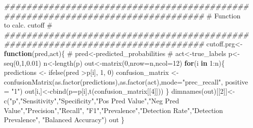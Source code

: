 \documentclass[
  letterpaper,
  DIV=11,
  numbers=noendperiod]{scrartcl}
\newenvironment{Shaded}{\begin{snugshade}}{\end{snugshade}}
\newcommand{\AttributeTok}[1]{\textcolor[rgb]{0.40,0.45,0.13}{#1}}
\newcommand{\CommentTok}[1]{\textcolor[rgb]{0.37,0.37,0.37}{#1}}
\newcommand{\ControlFlowTok}[1]{\textcolor[rgb]{0.00,0.23,0.31}{\textbf{#1}}}
\newcommand{\DecValTok}[1]{\textcolor[rgb]{0.68,0.00,0.00}{#1}}
\newcommand{\DocumentationTok}[1]{\textcolor[rgb]{0.37,0.37,0.37}{\textit{#1}}}
\newcommand{\FloatTok}[1]{\textcolor[rgb]{0.68,0.00,0.00}{#1}}
\newcommand{\FunctionTok}[1]{\textcolor[rgb]{0.28,0.35,0.67}{#1}}
\newcommand{\NormalTok}[1]{\textcolor[rgb]{0.00,0.23,0.31}{#1}}
\newcommand{\OtherTok}[1]{\textcolor[rgb]{0.00,0.23,0.31}{#1}}
\newcommand{\SpecialCharTok}[1]{\textcolor[rgb]{0.37,0.37,0.37}{#1}}
\newcommand{\StringTok}[1]{\textcolor[rgb]{0.13,0.47,0.30}{#1}}
\begin{document}
\begin{Shaded}
\begin{Highlighting}[]
\DocumentationTok{\#\#\#\#\#\#\#\#\#\#\#\#\#\#\#\#\#\#\#\#\#\#\#\#\#\#\#\#\#\#\#\#\#\#\#\#\#\#\#\#\#\#\#\#\#\#\#\#\#\#\#\#\#\#\#\#\#\#\#\#\#\#\#\#\#\#\#\#\#\#\#\#\#\#\#\#\#\#\#\#}
\CommentTok{\#                         Function to calc. cutoff                             \# }
\DocumentationTok{\#\#\#\#\#\#\#\#\#\#\#\#\#\#\#\#\#\#\#\#\#\#\#\#\#\#\#\#\#\#\#\#\#\#\#\#\#\#\#\#\#\#\#\#\#\#\#\#\#\#\#\#\#\#\#\#\#\#\#\#\#\#\#\#\#\#\#\#\#\#\#\#\#\#\#\#\#\#\#\#}
\NormalTok{cutoff.prg}\OtherTok{\textless{}{-}}\ControlFlowTok{function}\NormalTok{(pred,act)\{}
\CommentTok{\# pred\textless{}{-}predicted\_probabilities}
\CommentTok{\# act\textless{}{-}true\_labels}
\NormalTok{p}\OtherTok{\textless{}{-}}\FunctionTok{seq}\NormalTok{(}\DecValTok{0}\NormalTok{,}\DecValTok{1}\NormalTok{,}\FloatTok{0.01}\NormalTok{)}
\NormalTok{n}\OtherTok{\textless{}{-}}\FunctionTok{length}\NormalTok{(p)}
\NormalTok{out}\OtherTok{\textless{}{-}}\FunctionTok{matrix}\NormalTok{(}\DecValTok{0}\NormalTok{,}\AttributeTok{nrow=}\NormalTok{n,}\AttributeTok{ncol=}\DecValTok{12}\NormalTok{)}
\ControlFlowTok{for}\NormalTok{(i }\ControlFlowTok{in} \DecValTok{1}\SpecialCharTok{:}\NormalTok{n)\{}
\NormalTok{predictions }\OtherTok{\textless{}{-}} \FunctionTok{ifelse}\NormalTok{(pred }\SpecialCharTok{\textgreater{}}\NormalTok{p[i], }\DecValTok{1}\NormalTok{, }\DecValTok{0}\NormalTok{)}
\NormalTok{confusion\_matrix }\OtherTok{\textless{}{-}} \FunctionTok{confusionMatrix}\NormalTok{(}\FunctionTok{as.factor}\NormalTok{(predictions),}\FunctionTok{as.factor}\NormalTok{(act),}\AttributeTok{mode=}\StringTok{"prec\_recall"}\NormalTok{, }\AttributeTok{positive =} \StringTok{"1"}\NormalTok{)}
\NormalTok{out[i,]}\OtherTok{\textless{}{-}}\FunctionTok{cbind}\NormalTok{(}\AttributeTok{p=}\NormalTok{p[i],}\FunctionTok{t}\NormalTok{(confusion\_matrix[[}\DecValTok{4}\NormalTok{]]))}
\NormalTok{\}}
\FunctionTok{dimnames}\NormalTok{(out)[[}\DecValTok{2}\NormalTok{]]}\OtherTok{\textless{}{-}}\FunctionTok{c}\NormalTok{(}\StringTok{"p"}\NormalTok{,}\StringTok{"Sensitivity"}\NormalTok{,}\StringTok{"Specificity"}\NormalTok{,}\StringTok{"Pos Pred Value"}\NormalTok{,}\StringTok{"Neg Pred Value"}\NormalTok{,}\StringTok{"Precision"}\NormalTok{,}\StringTok{"Recall"}\NormalTok{, }\StringTok{"F1"}\NormalTok{,}\StringTok{"Prevalence"}\NormalTok{,}\StringTok{"Detection Rate"}\NormalTok{,}\StringTok{"Detection Prevalence"}\NormalTok{, }\StringTok{"Balanced Accuracy"}\NormalTok{)}
\NormalTok{out}
\NormalTok{\}}
\end{Highlighting}
\end{Shaded}
\end{document}
